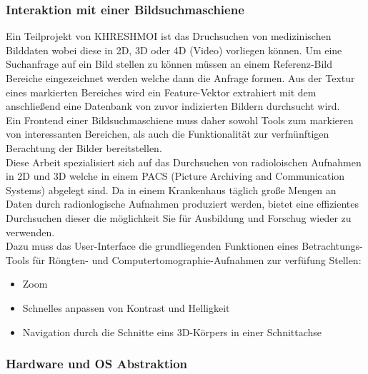 \subsubsection{Interaktion mit einer Bildsuchmaschiene}
\label{sec:Interaktion mit einer Bildsuchmaschiene}
Ein Teilprojekt von KHRESHMOI ist das Druchsuchen von medizinischen Bilddaten wobei diese in 2D, 3D oder 4D (Video) vorliegen können.
Um eine Suchanfrage auf ein Bild stellen zu können müssen an einem Referenz-Bild Bereiche eingezeichnet werden welche dann die Anfrage formen.
Aus der Textur eines markierten Bereiches wird ein Feature-Vektor extrahiert mit dem anschließend eine Datenbank von zuvor indizierten Bildern durchsucht wird.
\\
Ein Frontend einer Bildsuchmaschiene muss daher sowohl Tools zum markieren von interessanten Bereichen, 
als auch die Funktionalität zur verfnünftigen Berachtung der Bilder bereitstellen.
\\
Diese Arbeit spezialisiert sich auf das Durchsuchen von radioloischen Aufnahmen in 2D und 3D welche in einem PACS (Picture Archiving and Communication Systems) abgelegt sind.
Da in einem Krankenhaus täglich große Mengen an Daten durch radionlogische Aufnahmen produziert werden, 
bietet eine effizientes Durchsuchen dieser die möglichkeit Sie für Ausbildung und Forschug wieder zu verwenden.
\\
Dazu muss das User-Interface die grundliegenden Funktionen eines Betrachtungs-Tools für Röngten- und Computertomographie-Aufnahmen zur verfüfung Stellen:
\begin{itemize}
	\item Zoom
	\item Schnelles anpassen von Kontrast und Helligkeit
	\item Navigation durch die Schnitte eins 3D-Körpers in einer Schnittachse
\end{itemize}


\subsubsection{Hardware und OS Abstraktion}
\label{sec:Hardware und OS Abstraktion}

